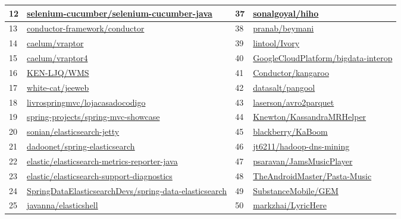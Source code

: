 \begin{table}[!h]
\begin{tabular}{|p{0.80cm}|p{6.0cm}|p{0.80cm}|p{6.0cm}|}
		12 & \href{https://github.com/selenium-cucumber/selenium-cucumber-java}{selenium-cucumber/selenium-cucumber-java} & 37 &
		\href{https://github.com/sonalgoyal/hiho}{sonalgoyal/hiho} \\ \hline
		13 & \href{https://github.com/conductor-framework/conductor}{conductor-framework/conductor} & 38 & \href{https://github.com/pranab/beymani}{pranab/beymani} \\ \hline
		14 & \href{https://github.com/caelum/vraptor}{caelum/vraptor} & 39 & \href{https://github.com/lintool/Ivory}{lintool/Ivory} \\ \hline 
		15 & \href{https://github.com/caelum/vraptor4}{caelum/vraptor4} & 40 & \href{https://github.com/GoogleCloudPlatform/bigdata-interop}{GoogleCloudPlatform/bigdata-interop} \\ \hline
		16 & \href{https://github.com/KEN-LJQ/WMS}{KEN-LJQ/WMS} & 41 & \href{https://github.com/Conductor/kangaroo}{Conductor/kangaroo} \\ \hline
		17 & \href{https://github.com/white-cat/jeeweb}{white-cat/jeeweb} & 42 & \href{https://github.com/datasalt/pangool}{datasalt/pangool} \\ \hline
		18 & \href{https://github.com/livrospringmvc/lojacasadocodigo}{livrospringmvc/lojacasadocodigo} & 43 & \href{https://github.com/laserson/avro2parquet}{laserson/avro2parquet} \\ \hline
		19 & \href{https://github.com/spring-projects/spring-mvc-showcase}{spring-projects/spring-mvc-showcase} & 44 & \href{https://github.com/Knewton/KassandraMRHelper}{Knewton/KassandraMRHelper} \\ \hline
		20 & \href{https://github.com/sonian/elasticsearch-jetty}{sonian/elasticsearch-jetty} & 45 & \href{https://github.com/blackberry/KaBoom}{blackberry/KaBoom} \\ \hline
		21 & \href{https://github.com/dadoonet/spring-elasticsearch}{dadoonet/spring-elasticsearch} & 46 & \href{https://github.com/jt6211/hadoop-dns-mining}{jt6211/hadoop-dns-mining} \\ \hline
		22 & \href{https://github.com/elastic/elasticsearch-metrics-reporter-java}{elastic/elasticsearch-metrics-reporter-java} & 47 & \href{https://github.com/psaravan/JamsMusicPlayer}{psaravan/JamsMusicPlayer} \\ \hline
		23 & \href{https://github.com/elastic/elasticsearch-support-diagnostics}{elastic/elasticsearch-support-diagnostics} & 48 & \href{https://github.com/TheAndroidMaster/Pasta-Music}{TheAndroidMaster/Pasta-Music} \\ \hline
		24 & \href{https://github.com/SpringDataElasticsearchDevs/spring-data-elasticsearch}{SpringDataElasticsearchDevs/spring-data-elasticsearch} & 49 & \href{https://github.com/SubstanceMobile/GEM}{SubstanceMobile/GEM} \\ \hline
		25 & \href{https://github.com/javanna/elasticshell}{javanna/elasticshell} & 50 & \href{https://github.com/markzhai/LyricHere}{markzhai/LyricHere} \\ \hline
		

\end{tabular}
\end{table}
